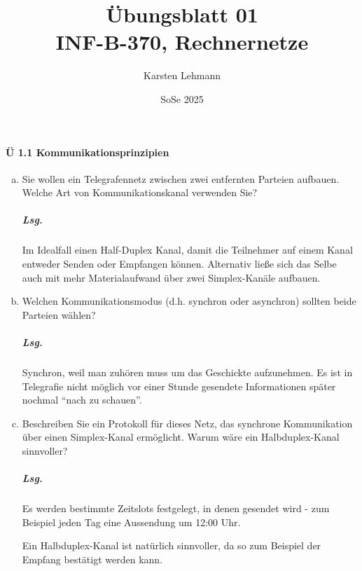 \documentclass{scrreprt}
\author{Karsten Lehmann}
\date{SoSe 2025}
\title{Übungsblatt 01\\INF-B-370, Rechnernetze}
\begin{document}
\paragraph{Ü 1.1 Kommunikationsprinzipien}
\begin{enumerate}[(a)]
\item Sie wollen ein Telegrafennetz zwischen zwei entfernten Parteien aufbauen.
  Welche Art von Kommunikationskanal verwenden Sie?

  \subparagraph{Lsg.} Im Idealfall einen Half-Duplex Kanal, damit die Teilnehmer
  auf einem Kanal entweder Senden oder Empfangen können.
  Alternativ ließe sich das Selbe auch mit mehr Materialaufwand über zwei
  Simplex-Kanäle aufbauen.

\item Welchen Kommunikationsmodus (d.h. synchron oder asynchron) sollten beide
  Parteien wählen?

  \subparagraph{Lsg.} Synchron, weil man zuhören muss um das Geschickte aufzunehmen.
  Es ist in Telegrafie nicht möglich vor einer Stunde gesendete Informationen
  später nochmal ``nach zu schauen''.

\item Beschreiben Sie ein Protokoll für dieses Netz, das synchrone Kommunikation
  über einen Simplex-Kanal ermöglicht.
  Warum wäre ein Halbduplex-Kanal sinnvoller?

  \subparagraph{Lsg.} Es werden bestimmte Zeitslots festgelegt, in denen
  gesendet wird - zum Beispiel jeden Tag eine Aussendung um 12:00 Uhr.

  Ein Halbduplex-Kanal ist natürlich sinnvoller, da so zum Beispiel der Empfang
  bestätigt werden kann.
\end{enumerate}
\end{document}
